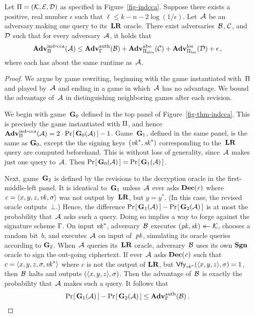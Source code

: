 \begin{theorem}\label{thm-indcca}
  Let $\mathrm{\Pi} = (\mathcal{K},\mathcal{E},\mathcal{D})$ as specified in Figure~\ref{fig-indcca}.
  Suppose there exists a positive, real number $\epsilon$ such that $\ell \leq k
  - n - 2\log(1/\epsilon)$.
  Let~$\mathcal{A}$ be an \indcca adversary making one query to its~$\mathbf{LR}$ oracle.
  There exist adversaries~$\mathcal{B}$, $\mathcal{C}$, and~$\mathcal{D}$ such that for every
  \indcca adversary~$\mathcal{A}$, it holds that
  \[
    \Adv{\indcca}_\pkescheme(\advA) \leq
      \Adv{\auth}_{\sigscheme}(\advB) +
      \Adv{\abo}_{\tdfscheme_\abo}(\advC) +
      \Adv{\los}_{\tdfscheme_\los}(\advD) +
      \epsilon \,,
  \]
  where each has about the same runtime as~$\mathcal{A}$.
\end{theorem}

\begin{proof}
  We argue by game rewriting, beginning with the \indcca game instantiated
  with~$\mathrm{\Pi}$ and played by~$\mathcal{A}$ and ending in a game in which~$\mathcal{A}$
  has no advantage. We bound the advantage of~$\mathcal{A}$ in distinguishing
  neighboring games after each revision.

  We begin with game~$\mathbf{G}_0$ defined in the top panel of
  Figure~\ref{fig-thm-indcca}. This is precisely the \indcca game instantiated
  with $\mathrm{\Pi}$, and hence $\Adv{\indcca}_\pkescheme(\advA) =
  2\cdot\prob{\G_0(\advA)}-1$.
  Game~$\mathbf{G}_1$, defined in the same panel, is the same as $\mathbf{G}_0$, except the the
  signing keys~$(\mathit{vk}^*, \mathit{sk}^*)$ corresponding to the~$\mathbf{LR}$ query are computed
  beforehand. This is without loss of generality, since~$\mathcal{A}$ makes just one
  query to~$\mathcal{A}$.
  Then ${\Pr\hspace{-1pt}\left[\,{\mathbf{G}_0(\mathcal{A})}\,\right]} = {\Pr\hspace{-1pt}\left[\,{\mathbf{G}_1(\mathcal{A})}\,\right]}$.

  Next, game~$\mathbf{G}_2$ is defined by the revisions to the decryption oracle in the
  first-middle-left panel.
  It is identical to~$\mathbf{G}_1$ unless~$\mathcal{A}$ ever asks $\mathbf{Dec}(\mathit{c})$ where $\mathit{c}
  = \langle x,y,z,\mathit{vk},\sigma \rangle$ was not output by~$\mathbf{LR}$, but $y=y^*$. (In this case,
  the revised oracle outputs~$\bot$.)
  Hence, the difference ${\Pr\hspace{-1pt}\left[\,{\mathbf{G}_1(\mathcal{A})}\,\right]} - {\Pr\hspace{-1pt}\left[\,{\mathbf{G}_2(\mathcal{A})}\,\right]}$ is at most the
  probability that~$\mathcal{A}$ asks such a query.
  Doing so implies a way to forge against the signature scheme $\mathrm{\Gamma}$.
  On input $\mathit{vk}^*$, \auth adversary~$\mathcal{B}$ executes $(\mathit{pk}, \mathit{sk}) \mathrel{\leftarrow\mkern-14mu\leftarrow} \mathcal{K}$, chooses
  a random bit~$b$, and executes~$\mathcal{A}$ on input of~$\mathit{pk}$, simulating its
  oracle queries according to $\mathbf{G}_2$. When~$\mathcal{A}$ queries its~$\mathbf{LR}$ oracle,
  adversary~$\mathcal{B}$ uses its own $\mathbf{Sgn}$ oracle to sign the out-going ciphertext.
  If ever~$\mathcal{A}$ asks $\mathbf{Dec}(\mathit{c})$ such that $c = \langle x,y,z,\sigma,\mathit{vk}^* \rangle$
  where $c$ is not the output of $\mathbf{LR}$, but $\mathsf{Vfy}_{\mathit{vk}^*}(\langle x,y,z \rangle,\sigma)
  = 1$, then~$\mathcal{B}$ halts and outputs $(\langle x,y,z \rangle, \sigma)$.
  Then the advantage of~$\mathcal{B}$ is exactly the probability that~$\mathcal{A}$ makes
  such a query. It follows that
  \begin{eqnarray}
    \prob{\G_1(\advA)} - \prob{\G_2(\advA)} \leq
    \Adv{\auth}_{\sigscheme}(\advB) \,.
  \end{eqnarray}


\end{proof}
